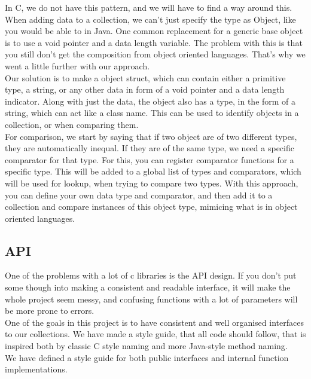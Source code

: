 \documentclass[11pt, letterpaper, twoside, openright]{book}
\begin{document}
    In C, we do not have this pattern, and we will have to find a way around this. When adding data to a collection, we can't just specify the type as Object, like you would be able to in Java. One common replacement for a generic base object is to use a void pointer and a data length variable. The problem with this is that you still don't get the composition from object oriented languages. That's why we went a little further with our approach.\\

    Our solution is to make a object struct, which can contain either a primitive type, a string, or any other data in form of a void pointer and a data length indicator. Along with just the data, the object also has a type, in the form of a string, which can act like a class name. This can be used to identify objects in a collection, or when comparing them.\\

    For comparison, we start by saying that if two object are of two different types, they are automatically inequal. If they are of the same type, we need a specific comparator for that type. For this, you can register comparator functions for a specific type. This will be added to a global list of types and comparators, which will be used for lookup, when trying to compare two types. With this approach, you can define your own data type and comparator, and then add it to a collection and compare instances of this object type, mimicing what is in object oriented languages.

  \subsection{API}
    One of the problems with a lot of c libraries is the API design. If you don't put some though into making a consistent and readable interface, it will make the whole project seem messy, and confusing functions with a lot of parameters will be more prone to errors.\\

    One of the goals in this project is to have consistent and well organised interfaces to our collections. We have made a style guide, that all code should follow, that is inspired both by classic C style naming and more Java-style method naming.\\

    We have defined a style guide for both public interfaces and internal function implementations.
\end{document}
